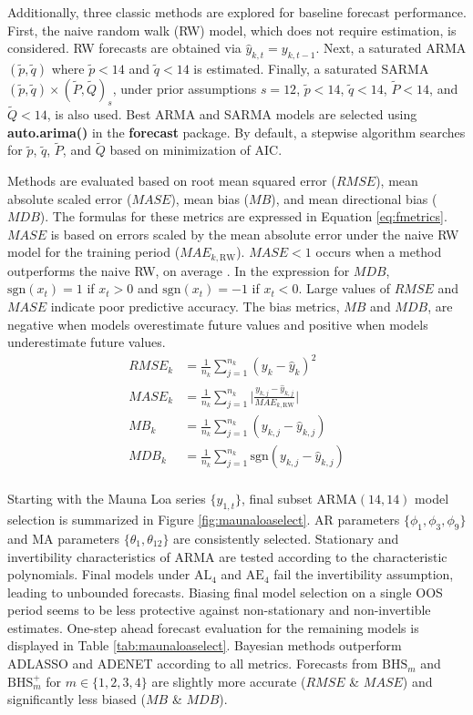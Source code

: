 Additionally, three classic methods are explored for baseline forecast performance. First, the naive random walk (RW) model, which does not require estimation, is considered. RW forecasts are obtained via $\hat{y}_{k,t}=y_{k,t-1}$. Next, a saturated ARMA$(\tilde{p},\tilde{q})$ where $\tilde{p}<14$ and $\tilde{q}<14$ is estimated. Finally, a saturated SARMA$(\tilde{p},\tilde{q})\times (\tilde{P},\tilde{Q})_s$, under prior assumptions $s=12$, $\tilde{p}<14$, $\tilde{q}<14$, $\tilde{P}<14$, and $\tilde{Q}<14$, is also used. Best ARMA and SARMA models are selected using {\bf auto.arima()} in the {\bf forecast} package. By default, a stepwise algorithm searches for $\tilde{p}$, $\tilde{q}$, $\tilde{P}$, and $\tilde{Q}$ based on minimization of AIC.

Methods are evaluated based on root mean squared error ($RMSE$), mean absolute scaled error ($MASE$), mean bias ($MB$), and mean directional bias ($MDB$). The formulas for these metrics are expressed in Equation \ref{eq:fmetrics}. $MASE$ is based on errors scaled by the mean absolute error under the naive RW model for the training period ($MAE_{k,\textrm{RW}}$). $MASE<1$ occurs when a method outperforms the naive RW, on average \citep{Hyndman2006}.   In the expression for $MDB$,  $\textrm{sgn}(x_t)=1$ if $x_t>0$ and $\textrm{sgn}(x_t)=-1$ if $x_t<0$. Large values of $RMSE$ and $MASE$ indicate poor predictive accuracy. The bias metrics, $MB$ and $MDB$, are negative when models overestimate future values and positive when models underestimate future values.
\begin{equation}
\label{eq:fmetrics}
\begin{split}
	RMSE_k&=\frac{1}{n_k} \sum\limits_{j=1}^{n_k} (y_k-\hat{y}_k)^2 \\
	MASE_k&=\frac{1}{n_k} \sum\limits_{j=1}^{n_k} \Bigg|\frac{y_{k,j}-\hat{y}_{k,j}}{MAE_{k,\textrm{RW}}}\Bigg| \\
	MB_k&=\frac{1}{n_k} \sum\limits_{j=1}^{n_k} (y_{k,j}-\hat{y}_{k,j}) \\
	MDB_k&=\frac{1}{n_k} \sum\limits_{j=1}^{n_k} \textrm{sgn}(y_{k,j}-\hat{y}_{k,j})\\
\end{split}
\end{equation}


Starting with the Mauna Loa series $\{y_{1,t}\}$, final subset ARMA$(14,14)$ model selection is summarized in Figure \ref{fig:maunaloaselect}. AR parameters $\{\phi_1,\phi_3,\phi_9\}$ and MA parameters $\{\theta_1,\theta_{12}\}$ are consistently selected. Stationary and invertibility characteristics of ARMA are tested according to the characteristic polynomials. Final models under $\textrm{AL}_4$ and $\textrm{AE}_4$ fail the invertibility assumption, leading to unbounded forecasts. Biasing final model selection on a single OOS period seems to be less protective against non-stationary and non-invertible estimates.  One-step ahead forecast evaluation for the remaining models is displayed in Table \ref{tab:maunaloaselect}. Bayesian methods outperform ADLASSO and ADENET according to all metrics. Forecasts from $\textrm{BHS}_m$ and $\textrm{BHS}^+_m$ for $m\in\{1,2,3,4\}$ are slightly more accurate ($RMSE$ \& $MASE$) and significantly less biased ($MB$ \& $MDB$). 

